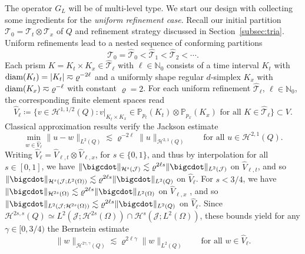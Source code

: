 \documentclass{amsart}
\providecommand{\tria}{\mathcal{T}}
\providecommand{\diam}{\textup{diam}}
\renewcommand{\P}{\mathbb P}
\newcommand{\cH}{\mathcal H}
\newcommand{\cJ}{\mathcal J}
\begin{document}
The operator $G_L$ will be of multi-level type. We start our design with collecting some ingredients for the \emph{uniform refinement case}.
Recall our initial partition $\tria_0 = \tria_t \otimes \tria_x$ of $Q$ and refinement strategy discussed in Section~\ref{subsec:tria}. Uniform refinements lead to a nested sequence of conforming partitions 
\begin{equation*}
\tria_0 = \widehat{\tria}_0 < \widehat{\tria}_1 < \widehat{\tria}_2 < \cdots .
\end{equation*}
Each prism $K=K_t \times K_x \in \widehat{\tria}_\ell$ with $\ell\in \mathbb{N}_0$ consists of a time interval $K_t$ with $\diam(K_t) = |K_t| \eqsim \varrho^{-2\ell}$ and a uniformly shape regular $d$-simplex $K_x$ with $\diam( K_x)\eqsim \varrho^{-\ell}$ with constant $\varrho = 2$. 
For each uniform refinement $\widehat{\tria}_\ell$, $\ell \in \mathbb{N}_0$, the corresponding finite element spaces read
\begin{equation*}
\widehat{V}_\ell \coloneqq \{v \in \cH^{1,1/2}(Q)\colon v|_{K_t \times K_x} \in \P_{p_t}(K_t) \otimes \P_{p_x}(K_x) \text{ for all }K \in \widehat{\tria}_\ell\} \subset V.
\end{equation*}
Classical approximation results verify the Jackson estimate
\begin{equation}\label{eq:Jackson}
\min_{w \in \widehat{V}_\ell}\|u-w\|_{L^2(Q)} \lesssim \varrho^{-2\ell} \|u\|_{\cH^{2,1}(Q)}\qquad \text{for all }u \in \cH^{2,1}(Q).
\end{equation}
Writing $\widehat{V}_\ell = \widehat{V}_{\ell,t} \otimes \widehat{V}_{\ell,x}$, for $s \in \{0,1\}$, and thus by interpolation for all $s \in [0,1]$, we have $\|\bigcdot\|_{\cH^{s}(\cJ)} \lesssim \varrho^{2\ell s}\|\bigcdot\|_{L^2(\cJ)}$ on $\widehat{V}_{\ell,t}  $, and so $\|\bigcdot\|_{\cH^{s}(\cJ;L^2(\Omega))} \lesssim \varrho^{2\ell s}\|\bigcdot\|_{L^2(Q)}$ on $\widehat{V}_{\ell} $. For $s<3/4$, we have $\|\bigcdot\|_{\cH^{2s}(\Omega)} \lesssim \varrho^{2\ell s}\|\bigcdot\|_{L^2(\Omega)}$ on $\widehat{V}_{\ell,x}$ \cite{75.64}, and so 
$\|\bigcdot\|_{L^2(\cJ;\cH^{2s}(\Omega))} \lesssim \varrho^{2\ell s}\|\bigcdot\|_{L^2(Q)}$ on $\widehat{V}_{\ell}$. Since $\cH^{2s,s}(Q) \simeq L^2(\cJ;\cH^{2s}(\Omega)) \cap \cH^{s}(\cJ;L^2(\Omega))$, these bounds yield for any $\gamma \in [0,3/4)$ the Bernstein estimate
\begin{equation}\label{eq:Bernstein}
 \|w\|_{\cH^{2\gamma,\gamma}(Q)} \lesssim \varrho^{2 \ell \gamma} \|w\|_{L^2(Q)} \qquad \text{for all }w \in \widehat{V}_\ell. 
\end{equation}
\end{document}
